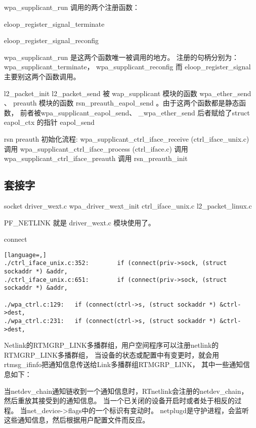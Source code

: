 \documentclass[a4paper,11pt,]{article}%
\begin{document}
wpa_supplicant_run 调用的两个注册函数：

\begin{itemize*}
    \item eloop_register_signal_terminate
    \item eloop_register_signal_reconfig
\end{itemize*}
wpa_supplicant_run 是这两个函数唯一被调用的地方。 
注册的句柄分别为：wpa_supplicant_terminate， wpa_supplicant_reconfig
而 eloop_register_signal 主要别这两个函数调用。



l2_packet_init
l2_packet_send 被 wap_supplicant 模块的函数 wpa_ether_send 、
preauth 模块的函数 rsn_preauth_eapol_send 。由于这两个函数都是静态函数，
前者被wpa_supplicant_eapol_send、 _wpa_ether_send
后者赋给了struct eapol_ctx 的指针 eapol_send

rsn preauth 初始化流程:
wpa_supplicant_ctrl_iface_receive (ctrl_iface_unix.c) 调用
wpa_supplicant_ctrl_iface_process (ctrl_iface.c) 调用 wpa_supplicant_ctrl_iface_preauth 调用 rsn_preauth_init



\subsection{套接字}
socket
driver_wext.c  wpa_driver_wext_init
ctrl_iface_unix.c
l2_packet_linux.c


PF_NETLINK 就是 driver_wext.c 模块使用了。

connect
\begin{lstlisting}[language=,]
./ctrl_iface_unix.c:352:		if (connect(priv->sock, (struct sockaddr *) &addr,
./ctrl_iface_unix.c:651:		if (connect(priv->sock, (struct sockaddr *) &addr,

./wpa_ctrl.c:129:	if (connect(ctrl->s, (struct sockaddr *) &ctrl->dest,
./wpa_ctrl.c:231:	if (connect(ctrl->s, (struct sockaddr *) &ctrl->dest,
\end{lstlisting}


Netlink的RTMGRP_LINK多播群组，用户空间程序可以注册netlink的RTMGRP_LINK多播群组，
当设备的状态或配置中有变更时，就会用rtmsg_ifinfo把通知信息传送给Link多播群组RTMGRP_LINK，
其中一些通知信息如下：
 
当netdev_chain通知链收到一个通知信息时，RTnetlink会注册的netdev_chain，
然后重放其接受到的通知信息。
当一个已关闭的设备开启时或者处于相反的过程。
当net_device->flags中的一个标识有变动时。
netplugd是守护进程，会监听这些通知信息，然后根据用户配置文件而反应。
\end{document}
